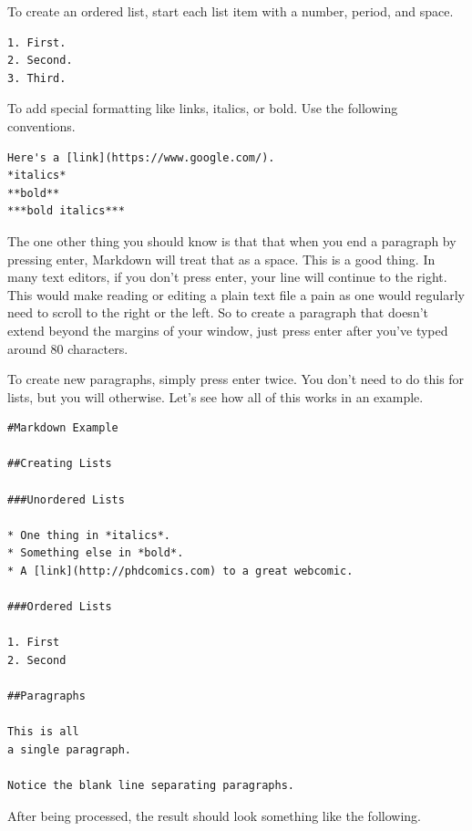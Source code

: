 \documentclass[12pt]{article}
\begin{document}
To create an ordered list, start each list item with a number, period, and space.

\begin{verbatim}
1. First.
2. Second.
3. Third.
\end{verbatim}

To add special formatting like links, italics, or bold. Use the following conventions.

\begin{verbatim}
Here's a [link](https://www.google.com/).
*italics*
**bold**
***bold italics***
\end{verbatim}

The one other thing you should know is that that when you end a paragraph by pressing
enter, Markdown will treat that as a space. This
is a good thing. In many text editors, if you don't press enter, your line will
continue to the right. This would make reading or editing a plain text file a pain as
one would regularly need to scroll to the right or the left. So to create a paragraph
that doesn't extend beyond the margins of your window, just press enter after you've
typed around 80 characters.

To create new paragraphs, simply press enter twice. You don't need to do this for lists,
but you will otherwise. Let's see how all of this works in an example.

\begin{verbatim}
#Markdown Example

##Creating Lists

###Unordered Lists

* One thing in *italics*.
* Something else in *bold*.
* A [link](http://phdcomics.com) to a great webcomic.

###Ordered Lists

1. First
2. Second

##Paragraphs

This is all
a single paragraph.

Notice the blank line separating paragraphs.
\end{verbatim}

After being processed, the result should look something like the following.
\end{document}
